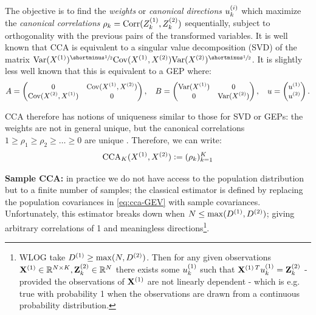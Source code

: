The objective is to find the \textit{weights} or \textit{canonical directions} $u_k^{(i)}$ which maximize the \textit{canonical correlations} $\rho_k = \operatorname{Corr}(Z^{(1)}_k, Z^{(2)}_k)$
sequentially, subject to orthogonality with the previous pairs of the transformed variables.
It is well known that CCA is equivalent to a singular value decomposition (SVD) of the matrix $\Var(X\sps{1})^\mhalf \Cov(X\sps{1}, X\sps{2}) \Var(X\sps{2})^\mhalf$.
It is slightly less well known \citep{borga_learning_1998} that this is equivalent to a GEP where:
\begin{equation}\label{eq:cca-GEV}\small
	A = \begin{pmatrix} 0 &\mathrm{Cov}(X^{(1)}, X^{(2)}) \\ \mathrm{Cov}(X^{(2)}, X^{(1)}) & 0 \end{pmatrix}, \quad
	B = \begin{pmatrix}\mathrm{Var}(X^{(1)}) & 0 \\ 0 & \mathrm{Var}(X^{(2)}) \end{pmatrix}, \quad
	u =\begin{pmatrix}	u^{(1)} \\ u^{(2)} \end{pmatrix}.
\end{equation}

CCA therefore has notions of uniqueness similar to those for SVD or GEPs: the weights are not in general unique, but the canonical correlations $1 \geq \rho_1 \geq \rho_2 \geq \dots \geq 0$ are unique \citep{mills1988calculation}. Therefore, we can write:
\begin{align}\label{eq:cca-vector-of-correlations-def}\small
    \operatorname{CCA}_K(X^{(1)},X^{(2)}) \vcentcolon= (\rho_k)_{k=1}^K
\end{align}


\textbf{Sample CCA:} in practice we do not have access to the population distribution but to a finite number of samples; the classical estimator is defined by replacing the population covariances in \cref{eq:cca-GEV} with sample covariances.
Unfortunately, this estimator breaks down when $N \leq \max(D^{(1)}, D^{(2)})$; giving arbitrary correlations of 1 and meaningless directions\footnote{WLOG take $D^{(1)} \geq \max(N, D^{(2)})$. Then for any given observations $\mathbf{X}^{(1)} \in \mathbb{R}^{N \times K}, \mathbf{Z}^{(2)}_k \in \mathbb{R}^N$ there exists some $u_k^{(1)}$ such that $\mathbf{X}^{(1)\,T} u_k^{(1)} = \mathbf{Z}^{(2)}_k$ - provided the observations of $\mathbf{X}^{(1)}$ are not linearly dependent - which is e.g. true with probability 1 when the observations are drawn from a continuous probability distribution.}.

